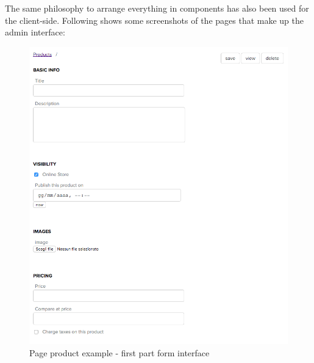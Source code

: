 The same philosophy to arrange everything in components has also been used for the client-side.
\newline
Following shows some screenshots of the pages that make up the admin interface:
\begin{figure}[htb]
\centering
\includegraphics[width=1.0\linewidth]{images/chapter4/products-example.png}\hfill
\caption[page product first part form]{Page product example - first part form interface}
\label{fig:design_page}
\end{figure}

